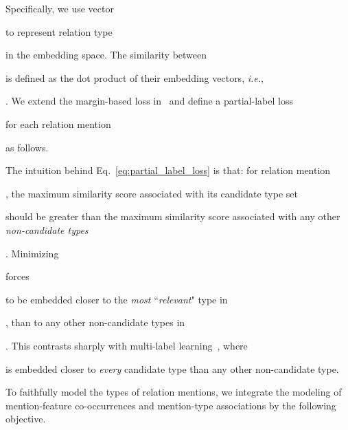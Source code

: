 \documentclass[letterpaper]{sig-alternate-2013}
\def\ie{{\sl i.e.}}
\begin{document}
Specifically, we use vector \begin{small}\end{small} to represent relation type \begin{small}\end{small} in the embedding space. 
The similarity between \begin{small}\end{small} is defined as the dot product of their embedding vectors, \ie, \begin{small}\end{small}. We extend the margin-based loss in~\cite{nguyen2008classification} and define a partial-label loss \begin{small}\end{small} for each relation mention \begin{small}\end{small} as follows.


The intuition behind Eq.~\eqref{eq:partial_label_loss} is that: for relation mention \begin{small}\end{small}, the maximum similarity score associated with its candidate type set \begin{small}\end{small} should be greater than the maximum similarity score associated with any other \textit{non-candidate types} \begin{small}\end{small}. Minimizing \begin{small}\end{small} forces \begin{small}\end{small} to be embedded closer to the \textit{most} ``\textit{relevant}" type in \begin{small}\end{small}, than to any other non-candidate types in \begin{small}\end{small}. This contrasts sharply with multi-label learning~\cite{ling2012fine}, where \begin{small}\end{small} is embedded closer to \textit{every} candidate type than any other non-candidate type.

To faithfully model the types of relation mentions, we integrate the modeling of mention-feature co-occurrences and mention-type associations by the following objective.
\end{document}
